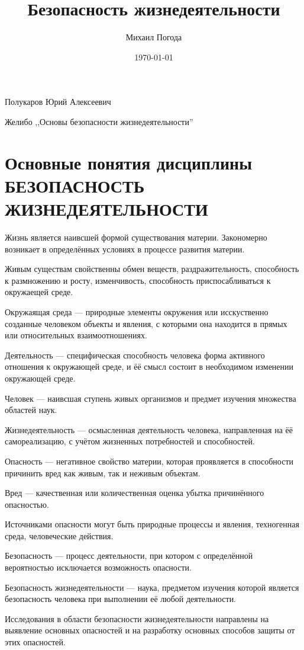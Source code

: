 \documentclass[a4paper,12pt,notitlepage,pdftex,headsepline]{scrartcl}
\author{Михаил Погода}
\title{Безопасность жизнедеятельности}
\date{\today}
\begin{document}
Полукаров Юрий Алексеевич

Желибо ,,Основы безопасности жизнедеятельности''
\section{Основные понятия дисциплины БЕЗОПАСНОСТЬ ЖИЗНЕДЕЯТЕЛЬНОСТИ}
Жизнь является наивсшей формой существования материи.
Закономерно возникает в определённых условиях в процессе развития материи.

Живым существам свойственны обмен веществ, раздражительность, способность к размножению и росту,
изменчивость, способность приспосабливаться к окружаещей среде.

Окружаящая среда --- природные элементы окружения или исскуственно созданные человеком объекты и явления, с которыми она находится в прямых или относительных взаимоотношениях.

Деятельность --- специфическая способность человека форма активного отношения к окружающей среде, и ёё смысл состоит в необходимом изменении окружающей среде.

Человек --- наивсшая ступень живых организмов и предмет изучения множества областей наук.

Жизнедеятельность --- осмысленная деятельность человека, направленная на ёё самореализацию, с учётом жизненных потребностей и способностей.

Опасность --- негативное свойство материи, которая проявляется в способности причинить вред как живым, так и неживым объектам.

Вред --- качественная или количественная оценка убытка причинённого опасностью.

Источниками опасности могут быть природные процессы и явления, техногенная среда, человеческие действия.

Безопасность --- процесс деятельности, при котором с определённой вероятностью исключается возможность опасности.

Безопасность жизнедеятельности --- наука, предметом изучения которой является безопасность человека при выполнении её любой деятельности.

Исследования в области безопасности жизнедеятельности направлены на выявление основных опасностей и на разработку основных способов защиты от этих опасностей.
\end{document}
